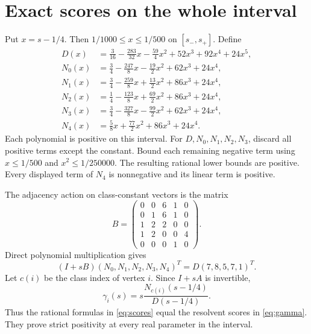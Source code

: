 \documentclass[11pt,a4paper]{article}
\begin{document}
\section{Exact scores on the whole interval}
Put $x=s-1/4$. Then $1/1000\leq x\leq1/500$ on $[s_-,s_+]$.
Define
\begin{align*}
D(x)&=\frac3{16}-\frac{283} {32}x-\frac{59}{4}x^2+52x^3+92x^4+24x^5,\\
N_0(x)&=\frac34-\frac{247}{8}x-\frac{19}{2}x^2+62x^3+24x^4,\\
N_1(x)&=\frac34-\frac{259}{8}x+\frac{13}{2}x^2+86x^3+24x^4,\\
N_2(x)&=\frac14-\frac{123}{8}x+\frac{69}{2}x^2+86x^3+24x^4,\\
N_3(x)&=\frac34-\frac{327}{8}x-\frac{99}{2}x^2+62x^3+24x^4,\\
N_4(x)&=\frac58x+\frac{77}{2}x^2+86x^3+24x^4.
\end{align*}
Each polynomial is positive on this interval. For $D,N_0,N_1,N_2,N_3$,
discard all positive terms except the constant. Bound each remaining
negative term using $x\leq1/500$ and $x^2\leq1/250000$.
The resulting rational lower bounds are positive. Every displayed term of
$N_4$ is nonnegative and its linear term is positive.

The adjacency action on class-constant vectors is the matrix
\[
 B=\begin{pmatrix}
0&0&6&1&0\\0&1&6&1&0\\1&2&2&0&0\\1&2&0&0&4\\0&0&0&1&0
\end{pmatrix}.
\]
Direct polynomial multiplication gives
\[
 (I+sB)(N_0,N_1,N_2,N_3,N_4)^T
   =D(7,8,5,7,1)^T.
\]
Let $c(i)$ be the class index of vertex $i$. Since $I+sA$ is invertible,
\begin{equation}\label{eq:scores}
 \gamma_i(s)=s\frac{N_{c(i)}(s-1/4)}{D(s-1/4)}.
\end{equation}
Thus the rational formulas in \eqref{eq:scores} equal the resolvent scores
in \eqref{eq:gamma}. They prove strict positivity at every real parameter
in the interval.
\end{document}
